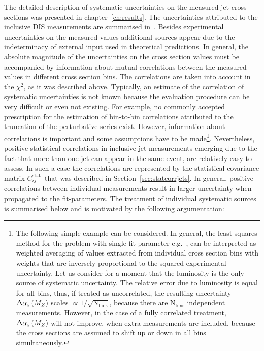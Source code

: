 The detailed description of systematic uncertainties on the measured jet cross sections was presented in chapter~\ref{ch:results}. The uncertainties attributed to the inclusive DIS measurements are summarised in~\cite{Aaron:2009aa}. Besides experimental uncertainties on the measured values additional sources appear due to the indeterminacy of external input used in theoretical predictions. In general, the absolute magnitude of the uncertainties on the cross section values must be accompanied by information about mutual correlations between the measured values in different cross section bins. The correlations are taken into account in the $\chi^2$, as it was described above. Typically, an estimate of the correlation of systematic uncertainties is not known because the evaluation procedure can be very difficult or even not existing. For example, no commonly accepted prescription for the estimation of bin-to-bin correlations attributed to the truncation of the perturbative series exist. However, information about correlations is important and some assumptions have to be made\footnote{The following simple example can be considered. In general, the least-squares method for the problem with single fit-parameter e.g.~\asz, can be interpreted as weighted averaging of \asz values extracted from individual cross section bins with weights that are inversely proportional to the squared experimental uncertainty. Let us consider for a moment that the luminosity is the only source of systematic uncertainty. The relative error due to luminosity is equal for all bins, thus, if treated as uncorrelated, the resulting uncertainty $\Delta\mbox{$\alpha_{s}\left(M_{Z}\right)$}$ scales $\propto 1/\sqrt{\text{N}_\text{bins}}$, because there are $\text{N}_\text{bins}$ independent \asz measurements. However, in the case of a fully correlated treatment, $\Delta\mbox{$\alpha_{s}\left(M_{Z}\right)$}$ will not improve, when extra measurements are included, because the cross sections are assumed to shift up or down in all bins simultaneously.}. Nevertheless, positive statistical correlations in inclusive-jet measurements emerging due to the fact that more than one jet can appear in the same event, are relatively easy to assess. In such a case the correlations are represented by the statistical covariance matrix $C_{ij}^{\text{stat.}}$ that was described in Section~\ref{sec:statcorrjets}. In general, positive correlations between individual measurements result in larger uncertainty when propagated to the fit-parameters. The treatment of individual systematic sources is summarised below and is motivated by the following argumentation: 
